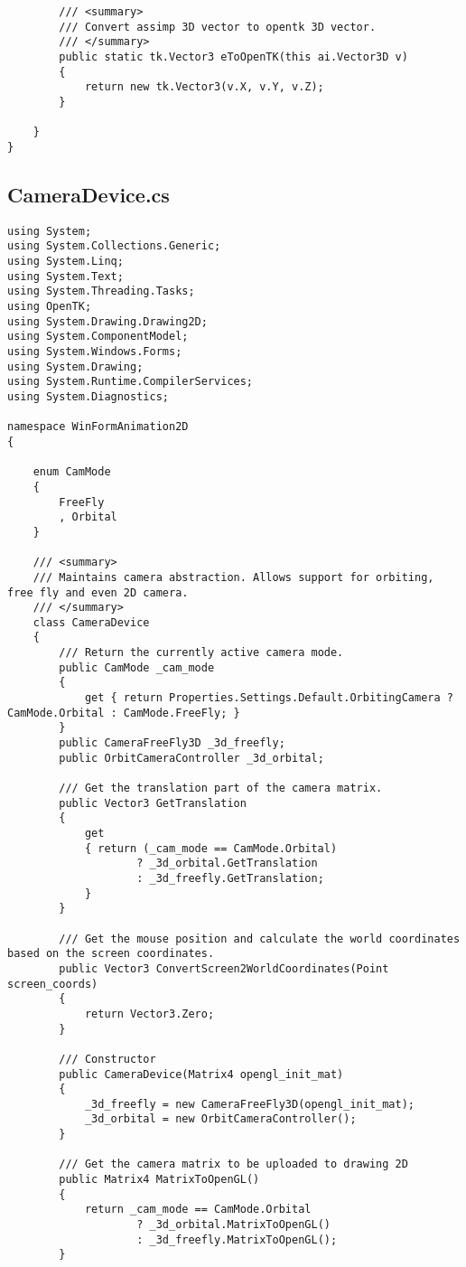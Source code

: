 \begin{scriptsize}
\begin{verbatim}
        /// <summary>
        /// Convert assimp 3D vector to opentk 3D vector.
        /// </summary>
        public static tk.Vector3 eToOpenTK(this ai.Vector3D v)
        {
            return new tk.Vector3(v.X, v.Y, v.Z);
        }

    }
}

\end{verbatim}
\subsection{CameraDevice.cs}
\begin{verbatim}
using System;
using System.Collections.Generic;
using System.Linq;
using System.Text;
using System.Threading.Tasks;
using OpenTK;
using System.Drawing.Drawing2D;
using System.ComponentModel;
using System.Windows.Forms;
using System.Drawing;
using System.Runtime.CompilerServices;
using System.Diagnostics;

namespace WinFormAnimation2D
{

    enum CamMode
    {
        FreeFly
        , Orbital
    }

    /// <summary>
    /// Maintains camera abstraction. Allows support for orbiting, free fly and even 2D camera.
    /// </summary>
    class CameraDevice
    {
        /// Return the currently active camera mode.
        public CamMode _cam_mode
        {
            get { return Properties.Settings.Default.OrbitingCamera ? CamMode.Orbital : CamMode.FreeFly; }
        }
        public CameraFreeFly3D _3d_freefly;
        public OrbitCameraController _3d_orbital;

        /// Get the translation part of the camera matrix.
        public Vector3 GetTranslation
        {
            get
            { return (_cam_mode == CamMode.Orbital) 
                    ? _3d_orbital.GetTranslation 
                    : _3d_freefly.GetTranslation;
            }
        }

        /// Get the mouse position and calculate the world coordinates based on the screen coordinates.
        public Vector3 ConvertScreen2WorldCoordinates(Point screen_coords)
        {
            return Vector3.Zero;
        }

        /// Constructor
        public CameraDevice(Matrix4 opengl_init_mat)
        {
            _3d_freefly = new CameraFreeFly3D(opengl_init_mat);
            _3d_orbital = new OrbitCameraController();
        }

        /// Get the camera matrix to be uploaded to drawing 2D
        public Matrix4 MatrixToOpenGL()
        {
            return _cam_mode == CamMode.Orbital 
                    ? _3d_orbital.MatrixToOpenGL() 
                    : _3d_freefly.MatrixToOpenGL();
        }


\end{verbatim}
\end{scriptsize}
